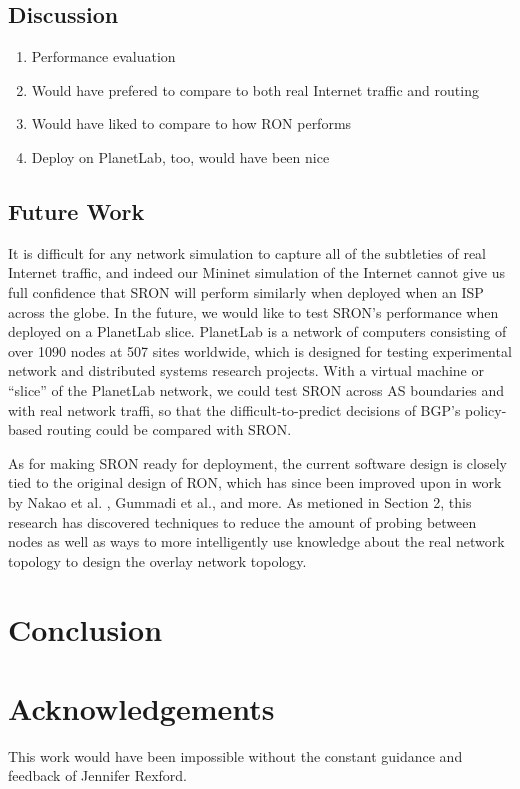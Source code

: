 \documentclass[pageno]{jpaper}
\begin{document}
\subsection{Discussion}
\begin{enumerate}
\item
Performance evaluation
\item
Would have prefered to compare to both real Internet traffic and routing
\item
Would have liked to compare to how RON performs
\item
Deploy on PlanetLab, too, would have been nice
\end{enumerate}

\subsection{Future Work}

	It is difficult for any network simulation to capture all of the subtleties of real 
Internet traffic, and indeed our Mininet simulation of the Internet cannot give us 
full confidence that SRON will perform similarly when deployed when an ISP across the globe.
In the future, we would like to test SRON's performance when deployed on a PlanetLab\cite{planetlab} 
slice.  PlanetLab is a network of computers consisting of over 1090 nodes at 507 sites worldwide, 
which is designed for testing experimental network and distributed systems research projects.  With a 
virtual machine or ``slice'' of the PlanetLab network, we could test SRON across AS boundaries and with 
real network traffi, so that 
the difficult-to-predict decisions of BGP's policy-based routing could be compared with SRON.

As for making SRON ready for deployment, the current software design is closely tied to the original design of 
RON, which has since been improved upon in work by Nakao et al. \cite{Nakao:2006:SRO:1113361.1113372}, Gummadi et al.\cite{Gummadi:2004:IRI:1251254.1251267}, and more.  As metioned in Section 2, this research has discovered techniques to reduce the amount of probing between nodes as well as ways to more intelligently use knowledge about the real network topology to design the overlay network topology.

\section{Conclusion}

\section{Acknowledgements}
This work would have been impossible without the constant guidance and feedback of Jennifer Rexford.




\end{document}
